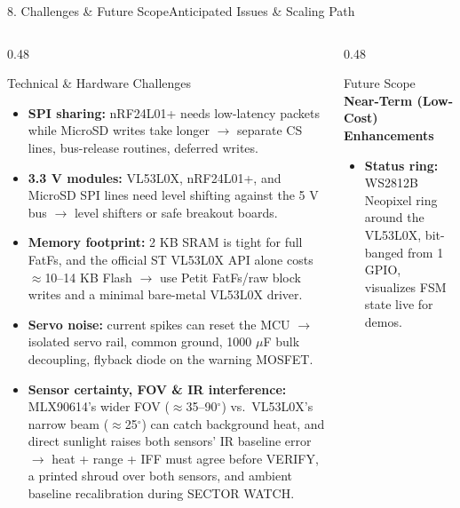 \documentclass[aspectratio=169, 10pt]{beamer}
\begin{document}
\begin{frame}{8. Challenges \& Future Scope}{Anticipated Issues \& Scaling Path}
    \begin{columns}[T]
        \begin{column}{0.48\textwidth}
            \begin{block}{Technical \& Hardware Challenges}
                \tiny
                \begin{itemize}
                    \item \textbf{SPI sharing:} nRF24L01+ needs low-latency packets while MicroSD writes take longer $\rightarrow$ separate CS lines, bus-release routines, deferred writes.
                    \item \textbf{3.3 V modules:} VL53L0X, nRF24L01+, and MicroSD SPI lines need level shifting against the 5 V bus $\rightarrow$ level shifters or safe breakout boards.
                    \item \textbf{Memory footprint:} 2 KB SRAM is tight for full FatFs, and the official ST VL53L0X API alone costs $\approx$10--14 KB Flash $\rightarrow$ use Petit FatFs/raw block writes and a minimal bare-metal VL53L0X driver.
                    \item \textbf{Servo noise:} current spikes can reset the MCU $\rightarrow$ isolated servo rail, common ground, 1000 $\mu$F bulk decoupling, flyback diode on the warning MOSFET.
                    \item \textbf{Sensor certainty, FOV \& IR interference:} MLX90614's wider FOV ($\approx$35--90$^\circ$) vs.\ VL53L0X's narrow beam ($\approx$25$^\circ$) can catch background heat, and direct sunlight raises both sensors' IR baseline error $\rightarrow$ heat + range + IFF must agree before VERIFY, a printed shroud over both sensors, and ambient baseline recalibration during SECTOR WATCH.
                \end{itemize}
            \end{block}
        \end{column}
        \begin{column}{0.48\textwidth}
            \begin{block}{Future Scope}
                \tiny
                \textbf{Near-Term (Low-Cost) Enhancements}
                \begin{itemize}
                    \item \textbf{Status ring:} WS2812B Neopixel ring around the VL53L0X, bit-banged from 1 GPIO, visualizes FSM state live for demos.

\end{itemize}
\end{block}
\end{column}
\end{columns}
\end{frame}
\end{document}
